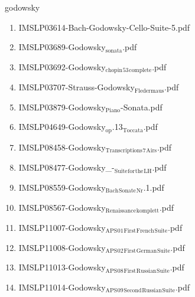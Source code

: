 \documentclass[11pt]{article}
\begin{document}
\item godowsky
\label{sec-1-1-1-1-44-34}
\begin{enumerate}
\item IMSLP03614-Bach-Godowsky-Cello-Suite-5.pdf
\label{sec-1-1-1-1-44-34-1}

\item IMSLP03689-Godowsky$_{\text{sonata}}$.pdf
\label{sec-1-1-1-1-44-34-2}

\item IMSLP03692-Godowsky$_{\text{chopin}}$$_{\text{53}}$$_{\text{complete}}$.pdf
\label{sec-1-1-1-1-44-34-3}

\item IMSLP03707-Strauss-Godowsky$_{\text{Fledermaus}}$.pdf
\label{sec-1-1-1-1-44-34-4}

\item IMSLP03879-Godowsky$_{\text{Piano}}$-Sonata.pdf
\label{sec-1-1-1-1-44-34-5}

\item IMSLP04649-Godowsky$_{\text{op}}$.13$_{\text{Toccata}}$.pdf
\label{sec-1-1-1-1-44-34-6}

\item IMSLP08458-Godowsky$_{\text{Transcriptions}}$$_{\text{7}}$$_{\text{Airs}}$.pdf
\label{sec-1-1-1-1-44-34-7}

\item IMSLP08477-Godowsky\_-$_{\text{Suite}}$$_{\text{for}}$$_{\text{the}}$$_{\text{LH}}$.pdf
\label{sec-1-1-1-1-44-34-8}

\item IMSLP08559-Godowsky$_{\text{Bach}}$$_{\text{Sonate}}$$_{\text{Nr}}$.1.pdf
\label{sec-1-1-1-1-44-34-9}

\item IMSLP08567-Godowsky$_{\text{Renaissance}}$$_{\text{komplett}}$.pdf
\label{sec-1-1-1-1-44-34-10}

\item IMSLP11007-Godowsky$_{\text{APS}}$$_{\text{01}}$$_{\text{First}}$$_{\text{French}}$$_{\text{Suite}}$.pdf
\label{sec-1-1-1-1-44-34-11}

\item IMSLP11008-Godowsky$_{\text{APS}}$$_{\text{02}}$$_{\text{First}}$$_{\text{German}}$$_{\text{Suite}}$.pdf
\label{sec-1-1-1-1-44-34-12}

\item IMSLP11013-Godowsky$_{\text{APS}}$$_{\text{08}}$$_{\text{First}}$$_{\text{Russian}}$$_{\text{Suite}}$.pdf
\label{sec-1-1-1-1-44-34-13}

\item IMSLP11014-Godowsky$_{\text{APS}}$$_{\text{09}}$$_{\text{Second}}$$_{\text{Russian}}$$_{\text{Suite}}$.pdf
\label{sec-1-1-1-1-44-34-14}


\end{enumerate}
\end{document}
